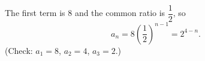 The first term is $8$ and the common ratio is $\dfrac12$, so
\[a_n=8\left(\dfrac12\right)^{n-1}=\boxed{2^{4-n}}.\]
(Check: $a_1=8$, $a_2=4$, $a_3=2$.)
